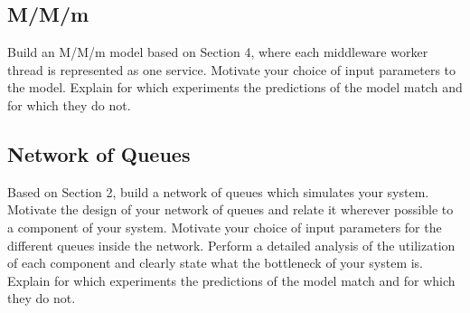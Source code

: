 \documentclass[11pt,a4paper]{article}
\begin{document}
\subsection{M/M/m}

Build an M/M/m model based on Section 4, where each middleware worker thread is represented as one service.  Motivate your choice of input parameters to the model. Explain for which experiments the predictions of the model match and for which they do not.

\subsection{Network of Queues}

Based on Section 2, build a network of queues which simulates your system. Motivate the design of your network of queues and relate it wherever possible to a component of your system. Motivate your choice of input parameters for the different queues inside the network. Perform a detailed analysis of the utilization of each component and clearly state what the bottleneck of your system is. Explain for which experiments the predictions of the model match and for which they do not.
\end{document}
